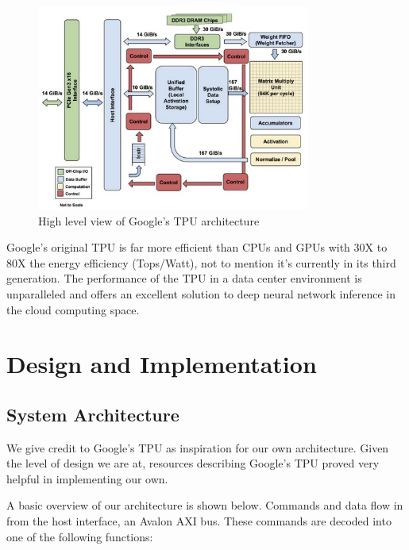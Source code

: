 \documentclass[11pt, conference, onecolumn]{IEEEtran}
\begin{document}
    \newpage

    \begin{figure}[htbp]
        \centering
        \includegraphics[width=9cm]{../figures/googleArchitecture.jpg}
        \caption{High level view of Google's TPU architecture \cite{b1}}
    \end{figure}

    Google’s original TPU is far more efficient than CPUs and GPUs with 30X to
    80X the energy efficiency (Tops/Watt), not to mention it’s currently in its third
    generation. The performance of the TPU in a data center environment is unparalleled
    and offers an excellent solution to deep neural network inference in the cloud computing
    space.


\section{Design and Implementation}

    \subsection{System Architecture}
        We give credit to Google's TPU as inspiration for our own architecture. Given the
        level of design we are at, resources describing Google's TPU proved very helpful
        in implementing our own.

        A basic overview of our architecture is shown below. Commands and data flow in
        from the host interface, an Avalon AXI bus. These commands are decoded into one of
        the following functions:
\end{document}
